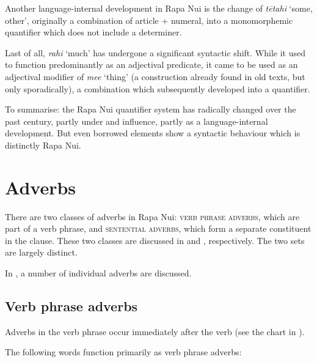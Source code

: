 Another language-internal development in Rapa Nui is the change of \textit{tētahi} ‘some, other’, originally a combination of article + numeral, into a monomorphemic quantifier which does not include a determiner.

Last of all, \textit{rahi} ‘much’ has undergone a significant syntactic shift. While it used to function predominantly as an adjectival predicate, it came to be used as an adjectival modifier of \textit{me{\ꞌ}e} ‘thing’ (a construction already found in old texts, but only sporadically), a combination which subsequently developed into a quantifier.

To summarise: the Rapa Nui quantifier system has radically changed over the past century, partly under  and  influence, partly as a language-internal development. But even borrowed elements show a syntactic behaviour which is distinctly Rapa Nui.
\section{Adverbs}\label{sec:4.5}

There are two classes of adverbs in Rapa Nui: \textsc{verb phrase} \textsc{adverbs}, which are part of a verb phrase, and \textsc{sentential adverbs}, which form a separate constituent in the clause. These two classes are discussed in  and , respectively. The two sets are largely distinct. 

In , a number of individual adverbs are discussed.

\subsection{Verb phrase adverbs}\label{sec:4.5.1}
Adverbs in the verb phrase occur immediately after the verb (see the chart in ). 

The following words function primarily as verb phrase adverbs: 

